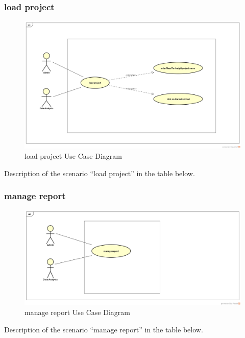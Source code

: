 \documentclass[12pt]{article}
\begin{document}
	 \subsubsection{load project}
	 	\begin{figure}[h]
	\centering
	\includegraphics[width=1.0\textwidth]{loadProject.png}
	\caption{load project Use Case Diagram}
	
	\end{figure}
 Description of the scenario ``load project'' in the table below.
\clearpage
\newpage
	 \subsubsection{manage report}
	 	\begin{figure}[h]
	 	\centering
	 	\includegraphics[width=1.0\textwidth]{manageReport.png}
	 	\caption{manage report Use Case Diagram}
	 	
	 \end{figure}
  Description of the scenario ``manage report'' in the table below.
 \clearpage
 \newpage
\end{document}
